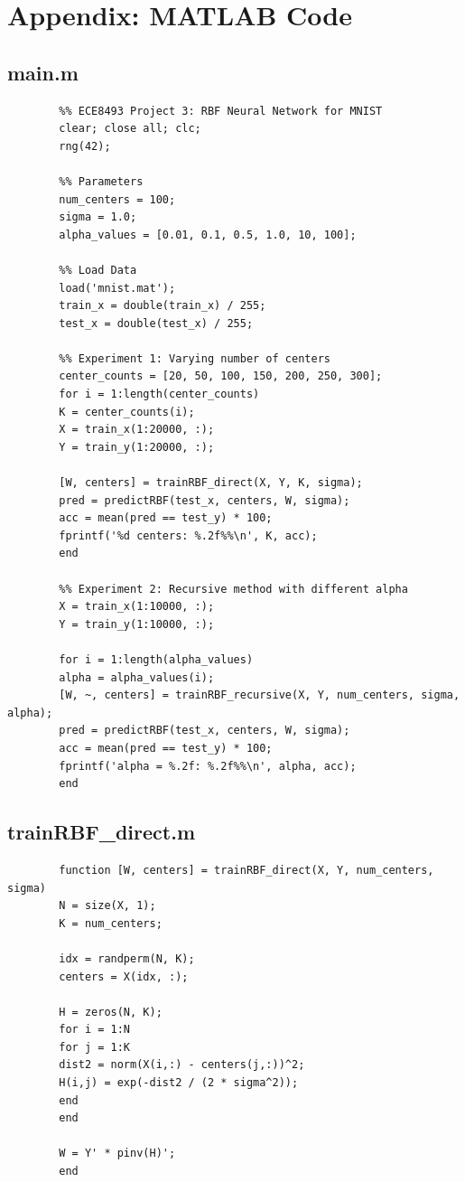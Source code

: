 \documentclass[12pt]{article}
\begin{document}
	\newpage
	\section*{Appendix: MATLAB Code}
	
	\subsection*{main.m}
	\begin{lstlisting}
		%% ECE8493 Project 3: RBF Neural Network for MNIST
		clear; close all; clc;
		rng(42);
		
		%% Parameters
		num_centers = 100;
		sigma = 1.0;
		alpha_values = [0.01, 0.1, 0.5, 1.0, 10, 100];
		
		%% Load Data
		load('mnist.mat');
		train_x = double(train_x) / 255;
		test_x = double(test_x) / 255;
		
		%% Experiment 1: Varying number of centers
		center_counts = [20, 50, 100, 150, 200, 250, 300];
		for i = 1:length(center_counts)
		K = center_counts(i);
		X = train_x(1:20000, :);
		Y = train_y(1:20000, :);
		
		[W, centers] = trainRBF_direct(X, Y, K, sigma);
		pred = predictRBF(test_x, centers, W, sigma);
		acc = mean(pred == test_y) * 100;
		fprintf('%d centers: %.2f%%\n', K, acc);
		end
		
		%% Experiment 2: Recursive method with different alpha
		X = train_x(1:10000, :);
		Y = train_y(1:10000, :);
		
		for i = 1:length(alpha_values)
		alpha = alpha_values(i);
		[W, ~, centers] = trainRBF_recursive(X, Y, num_centers, sigma, alpha);
		pred = predictRBF(test_x, centers, W, sigma);
		acc = mean(pred == test_y) * 100;
		fprintf('alpha = %.2f: %.2f%%\n', alpha, acc);
		end
	\end{lstlisting}
	
	\subsection*{trainRBF\_direct.m}
	\begin{lstlisting}
		function [W, centers] = trainRBF_direct(X, Y, num_centers, sigma)
		N = size(X, 1);
		K = num_centers;
		
		idx = randperm(N, K);
		centers = X(idx, :);
		
		H = zeros(N, K);
		for i = 1:N
		for j = 1:K
		dist2 = norm(X(i,:) - centers(j,:))^2;
		H(i,j) = exp(-dist2 / (2 * sigma^2));
		end
		end
		
		W = Y' * pinv(H)';
		end
	\end{lstlisting}
	
\end{document}
